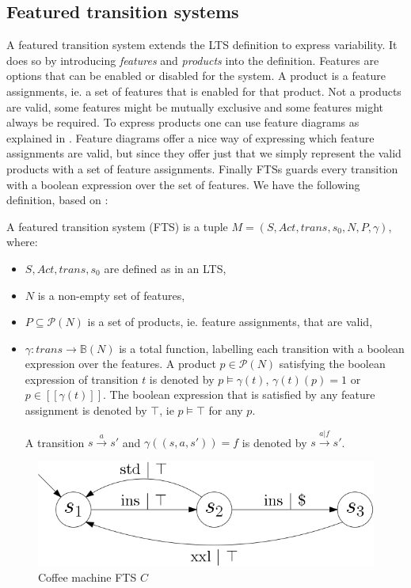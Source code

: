 \subsection{Featured transition systems}
A featured transition system extends the LTS definition to express variability. It does so by introducing \textit{features} and \textit{products} into the definition. Features are options that can be enabled or disabled for the system. A product is a feature assignments, ie. a set of features that is enabled for that product. Not a products are valid, some features might be mutually exclusive and some features might always be required. To express products one can use feature diagrams as explained in \cite{Classen2013FeaturedTS}. Feature diagrams offer a nice way of expressing which feature assignments are valid, but since they offer just that we simply represent the valid products with a set of feature assignments. Finally FTSs guards every transition with a boolean expression over the set of features. We have the following definition, based on \cite{Classen2013FeaturedTS}:
\begin{definition}
	\label{def_fts}A featured transition system (FTS) is a tuple $M = (S, Act, trans, s_0, N, P, \gamma)$, where:
	\begin{itemize}
		\item $S, Act, trans, s_0$ are defined as in an LTS,
		\item $N$ is a non-empty set of features,
		\item $P \subseteq \mathcal{P}(N)$ is a set of products, ie. feature assignments, that are valid,
		\item $\gamma : trans \rightarrow \mathbb{B}(N)$ is a total function, labelling each transition with a boolean expression over the features. A product $p \in \mathcal{P}(N)$ satisfying the boolean expression of transition $t$ is denoted by $p \models \gamma(t)$, $\gamma(t)(p) = 1$ or $p \in [\![\gamma(t)]\!]$. The boolean expression that is satisfied by any feature assignment is denoted by $\top$, ie $p \models \top$ for any $p$.
		
		A transition $s \xrightarrow a s'$ and $\gamma((s,a,s')) = f$ is denoted by $s \xrightarrow {a | f} s'$. 
	\end{itemize}
\end{definition}
\begin{figure}[h]
\centering
\includegraphics[scale=0.5]{Examples/CoffeeMachine/FTS}
\caption[Coffee machine LTS]{Coffee machine FTS $C$}
\label{fig:coffeemachinefts}
\end{figure}

